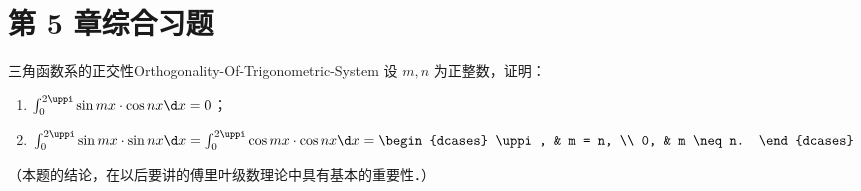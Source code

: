 \section{第 5 章综合习题}

\begin{problem}{三角函数系的正交性}{Orthogonality-Of-Trigonometric-System}
    设 $m, n$ 为正整数，证明：
    \begin{enumerate}
        \item $\int_0^{2\uppi} \sin mx \cdot \cos nx \d x = 0$；
        \item $\int_0^{2\uppi} \sin mx \cdot \sin nx \d x = \int_0^{2\uppi} \cos mx \cdot \cos nx \d x = \begin{dcases} \uppi, & m = n, \\ 0, & m \neq n. \end{dcases}$
    \end{enumerate}
    （本题的结论，在以后要讲的傅里叶级数理论中具有基本的重要性．）
\end{problem}

